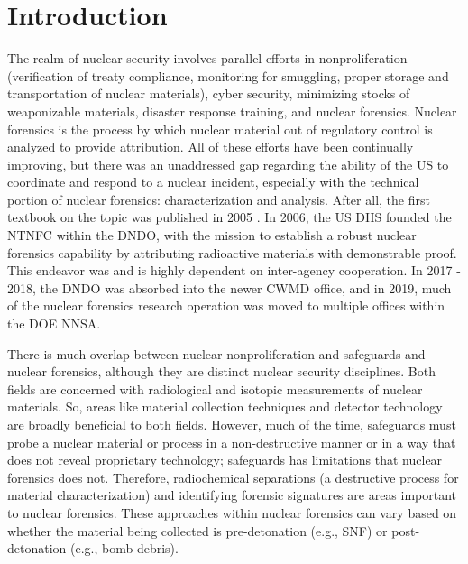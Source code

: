 
\glsresetall

\chapter{Introduction}
\label{ch:intro}
The realm of nuclear security involves parallel efforts in nonproliferation
(verification of treaty compliance, monitoring for smuggling, proper storage
and transportation of nuclear materials), cyber security, minimizing stocks of
weaponizable materials, disaster response training, and nuclear forensics.
Nuclear forensics is the process by which nuclear material out of regulatory
control is analyzed to provide attribution.  All of these efforts have been
continually improving, but there was an unaddressed gap regarding the ability
of the \gls{US} to coordinate and respond to a nuclear incident, especially
with the technical portion of nuclear forensics: characterization and analysis.
After all, the first textbook on the topic was published in 2005
\cite{nftext_2005}. In 2006, the \gls{US} \gls{DHS} founded the \gls{NTNFC}
within the \gls{DNDO}, with the mission to establish a robust nuclear forensics
capability by attributing radioactive materials with demonstrable proof. This
endeavor was and is highly dependent on inter-agency cooperation. In 2017 \--
2018, the \gls{DNDO} was absorbed into the newer \gls{CWMD} office, and in
2019, much of the nuclear forensics research operation was moved to multiple
offices within the \gls{DOE} \gls{NNSA}. 

There is much overlap between nuclear nonproliferation and safeguards and
nuclear forensics, although they are distinct nuclear security disciplines.
Both fields are concerned with radiological and isotopic measurements of
nuclear materials. So, areas like material collection techniques and detector
technology are broadly beneficial to both fields. However, much of the time,
safeguards must probe a nuclear material or process in a non-destructive manner
or in a way that does not reveal proprietary technology; safeguards has
limitations that nuclear forensics does not.  Therefore, radiochemical
separations (a destructive process for material characterization) and
identifying forensic signatures are areas important to nuclear forensics.
These approaches within nuclear forensics can vary based on whether the
material being collected is pre-detonation (e.g., \gls{SNF}) or post-detonation
(e.g., bomb debris). 

